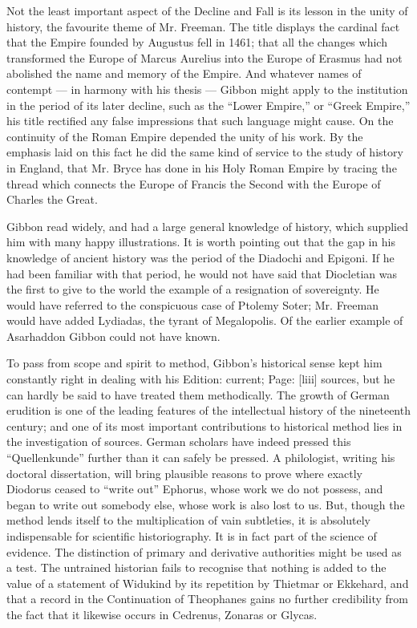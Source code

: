 Not the least important aspect of the Decline and Fall is its lesson in the unity of history, the favourite theme of Mr. Freeman. The title displays the cardinal fact that the Empire founded by Augustus fell in 1461; that all the changes which transformed the Europe of Marcus Aurelius into the Europe of Erasmus had not abolished the name and memory of the Empire. And whatever names of contempt \texthebrew{—} in harmony with his thesis \texthebrew{—} Gibbon might apply to the institution in the period of its later decline, such as the \texthebrew{“}Lower Empire,\texthebrew{}” or \texthebrew{“}Greek Empire,\texthebrew{}” his title rectified any false impressions that such language might cause. On the continuity of the Roman Empire depended the unity of his work. By the emphasis laid on this fact he did the same kind of service to the study of history in England, that Mr. Bryce has done in his Holy Roman Empire by tracing the thread which connects the Europe of Francis the Second with the Europe of Charles the Great.

Gibbon read widely, and had a large general knowledge of history, which supplied him with many happy illustrations. It is worth pointing out that the gap in his knowledge of ancient history was the period of the Diadochi and Epigoni. If he had been familiar with that period, he would not have said that Diocletian was the first to give to the world the example of a resignation of sovereignty. He would have referred to the conspicuous case of Ptolemy Soter; Mr. Freeman would have added Lydiadas, the tyrant of Megalopolis. Of the earlier example of Asarhaddon Gibbon could not have known.

To pass from scope and spirit to method, Gibbon\texthebrew{}’s historical sense kept him constantly right in dealing with his Edition: current; Page: [liii] sources, but he can hardly be said to have treated them methodically. The growth of German erudition is one of the leading features of the intellectual history of the nineteenth century; and one of its most important contributions to historical method lies in the investigation of sources. German scholars have indeed pressed this \texthebrew{“}Quellenkunde\texthebrew{}” further than it can safely be pressed. A philologist, writing his doctoral dissertation, will bring plausible reasons to prove where exactly Diodorus ceased to \texthebrew{“}write out\texthebrew{}” Ephorus, whose work we do not possess, and began to write out somebody else, whose work is also lost to us. But, though the method lends itself to the multiplication of vain subtleties, it is absolutely indispensable for scientific historiography. It is in fact part of the science of evidence. The distinction of primary and derivative authorities might be used as a test. The untrained historian fails to recognise that nothing is added to the value of a statement of Widukind by its repetition by Thietmar or Ekkehard, and that a record in the Continuation of Theophanes gains no further credibility from the fact that it likewise occurs in Cedrenus, Zonaras or Glycas.

